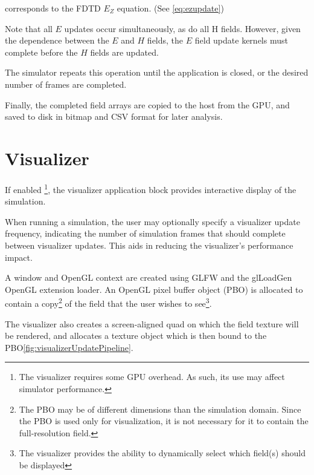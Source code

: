 corresponds to the FDTD $E_Z$ equation. (See \autoref{eq:ezupdate})

\label{listing:updateHxCpp}

\label{listing:updateHyCpp}

Note that all $E$ updates occur simultaneously, as do all H fields. However, given the dependence between the $E$ and $H$ fields, the $E$ field update kernels must complete before the $H$ fields are updated.

The simulator repeats this operation until the application is closed, or the desired number of frames are completed. 

Finally, the completed field arrays are copied to the host from the GPU, and saved to disk in bitmap and CSV format for later analysis. 

\section{Visualizer}\label{sec:visualizer}

If enabled \footnote{The visualizer requires some GPU overhead. As such, its use may affect simulator performance.}, the visualizer application block provides interactive display of the simulation. 

When running a simulation, the user may optionally specify a visualizer update frequency, indicating the number of simulation frames that should complete between visualizer updates. This aids in reducing the visualizer's performance impact.

A window and OpenGL context are created using GLFW and the glLoadGen OpenGL extension loader. An OpenGL pixel buffer object (PBO) is allocated to contain a copy\footnote{The PBO may be of different dimensions than the simulation domain. Since the PBO is used only for visualization, it is not necessary for it to contain the full-resolution field.} of the field that the user wishes to see\footnote{The visualizer provides the ability to dynamically select which field(s) should be displayed}. 

The visualizer also creates a screen-aligned quad on which the field texture will be rendered, and allocates a texture object which is then bound to the PBO\autoref{fig:visualizerUpdatePipeline}.

